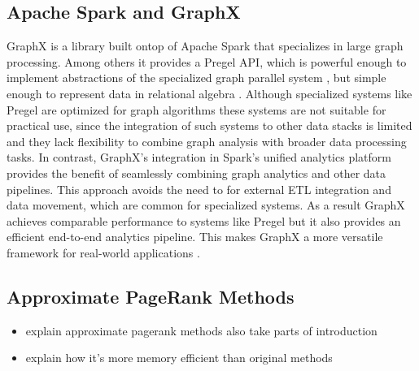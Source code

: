 \subsection{Apache Spark and GraphX}


GraphX is a library built ontop of Apache Spark that specializes in large graph processing. Among others it provides a Pregel API, which is powerful enough to implement abstractions of the specialized graph parallel system \cite{malewicz_pregel_2010}, but simple enough to represent data in relational algebra \cite{xin_graphx_2014}. Although specialized systems like Pregel are optimized for graph algorithms these systems are not suitable for practical use, since the integration of such systems to other data stacks is limited and they lack flexibility to combine graph analysis with broader data processing tasks. In contrast, GraphX's integration in Spark's unified analytics platform provides the benefit of seamlessly combining graph analytics and other data pipelines. This approach avoids the need to for external ETL integration and data movement, which are common for specialized systems. As a result GraphX achieves comparable performance to systems like Pregel but it also provides an efficient end-to-end analytics pipeline. This makes GraphX a more versatile framework for real-world applications \cite{xin_graphx_2014}.


\subsection{Approximate PageRank Methods}
\begin{itemize}
    \item explain approximate pagerank methods also take parts of introduction
    \item explain how it's more memory efficient than original methods
\end{itemize}